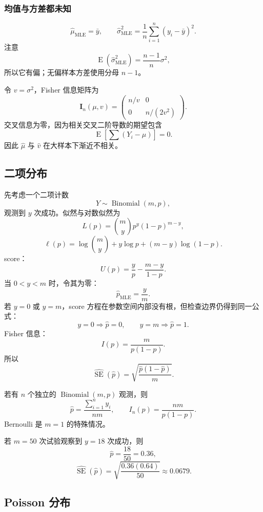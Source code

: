 \documentclass[11pt,a4paper]{article}
\newcommand{\E}{\operatorname{E}}
\newcommand{\SE}{\operatorname{SE}}
\newcommand{\1}{\mathbf{1}}
\begin{document}
\subsubsection{均值与方差都未知}

\[
  \boxed{
  \hat\mu_{\mathrm{MLE}}=\bar y,
  \qquad
  \hat\sigma_{\mathrm{MLE}}^2
  =
  \frac1n\sum_{i=1}^n(y_i-\bar y)^2.
  }
\]
注意
\[
  \E(\hat\sigma_{\mathrm{MLE}}^2)
  =
  \frac{n-1}{n}\sigma^2,
\]
所以它有偏；无偏样本方差使用分母 $n-1$。

令 $v=\sigma^2$，Fisher 信息矩阵为
\[
  \boxed{
  \mathbf I_n(\mu,v)
  =
  \begin{pmatrix}
    n/v & 0\\
    0 & n/(2v^2)
  \end{pmatrix}.
  }
\]
交叉信息为零，因为相关交叉二阶导数的期望包含
\[
  \E\left[\sum(Y_i-\mu)\right]=0.
\]
因此 $\hat\mu$ 与 $\hat v$ 在大样本下渐近不相关。

\subsection{二项分布}

先考虑一个二项计数
\[
  Y\sim\operatorname{Binomial}(m,p),
\]
观测到 $y$ 次成功。似然与对数似然为
\[
  L(p)
  =
  \binom myp^y(1-p)^{m-y},
\]
\[
  \ell(p)
  =
  \log\binom my+y\log p+(m-y)\log(1-p).
\]
score：
\[
  U(p)=\frac yp-\frac{m-y}{1-p}.
\]
当 $0<y<m$ 时，令其为零：
\[
  \boxed{\hat p_{\mathrm{MLE}}=\frac ym.}
\]
若 $y=0$ 或 $y=m$，score 方程在参数空间内部没有根，但检查边界仍得到同一公式：
\[
  y=0\Rightarrow\hat p=0,
  \qquad
  y=m\Rightarrow\hat p=1.
\]
Fisher 信息：
\[
  \boxed{
  I(p)=\frac{m}{p(1-p)}.
  }
\]
所以
\[
  \boxed{
  \widehat{\SE}(\hat p)
  =
  \sqrt{\frac{\hat p(1-\hat p)}{m}}.
  }
\]

若有 $n$ 个独立的 $\operatorname{Binomial}(m,p)$ 观测，则
\[
  \hat p=\frac{\sum_{i=1}^ny_i}{nm},
  \qquad
  I_n(p)=\frac{nm}{p(1-p)}.
\]
Bernoulli 是 $m=1$ 的特殊情况。

\begin{examplebox}
若 $m=50$ 次试验观察到 $y=18$ 次成功，则
\[
  \hat p=\frac{18}{50}=0.36,
\]
\[
  \widehat{\SE}(\hat p)
  =
  \sqrt{\frac{0.36(0.64)}{50}}
  \approx0.0679.
\]
\end{examplebox}

\subsection{Poisson 分布}
\end{document}
